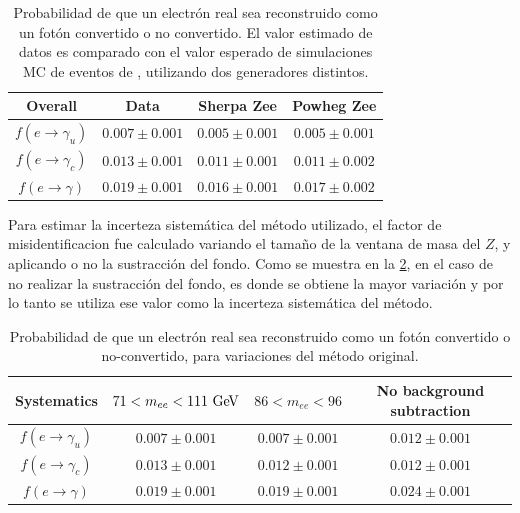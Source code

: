\begin{table}[!h]
  \centering
  \caption{Probabilidad de que un electrón real sea reconstruido como un fotón convertido o no
    convertido. El valor estimado de datos es comparado con el valor esperado
    de simulaciones MC de eventos de {\Zee}, utilizando dos generadores distintos.}
  \begin{tabular}{cccc}
    \hline
    \hline
    Overall       & Data              & Sherpa Zee        & Powheg Zee        \\
    \hline
    $f(e\to \gamma_u)$ & $0.007 \pm 0.001$ & $0.005 \pm 0.001$ & $0.005 \pm 0.001$ \\
    $f(e\to \gamma_c)$ & $0.013 \pm 0.001$ & $0.011 \pm 0.001$ & $0.011 \pm 0.002$ \\
    $f(e\to \gamma)$   & $0.019 \pm 0.001$ & $0.016 \pm 0.001$ & $0.017 \pm 0.002$ \\
    \hline
    \hline
  \end{tabular}
  \label{tab:efake_uc}
\end{table}

Para estimar la incerteza sistemática del método utilizado, el factor de misidentificacion fue
calculado variando el tamaño de la ventana de masa del $Z$, y aplicando o no la sustracción
del fondo. Como se muestra en la \cref{tab:efake_syst}, en el caso de no realizar la
sustracción del fondo, es donde se obtiene la mayor variación y por lo tanto se utiliza ese valor
como la incerteza sistemática del método.

\begin{table}[!h]
  \centering
  \caption{Probabilidad de que un electrón real sea reconstruido como un fotón
    convertido o no-convertido, para variaciones del método original.}
  \begin{tabular}{cccc}
    \hline
    \hline
     Systematics       &  $71 < m_{ee} < 111 \GeV$ & $86 < m_{ee} < 96$ & No background subtraction  \\
    \hline
    $f(e\to \gamma_u)$ & $0.007 \pm 0.001$ & $0.007 \pm 0.001$ & $0.012 \pm 0.001$ \\
    $f(e\to \gamma_c)$ & $0.013 \pm 0.001$ & $0.012 \pm 0.001$ & $0.012 \pm 0.001$ \\
    $f(e\to \gamma)$   & $0.019 \pm 0.001$ & $0.019 \pm 0.001$ & $0.024 \pm 0.001$ \\
    \hline
    \hline
  \end{tabular}
  \label{tab:efake_syst}
\end{table}


